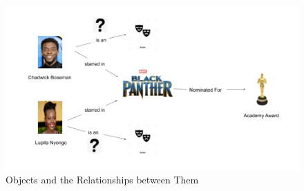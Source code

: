 \begin{figure}
  	\caption{Objects and the Relationships between Them}
   	\centering
    	\includegraphics[width=\textwidth]{Objects_and_the_Relationships_Between_Them}
\end{figure}


